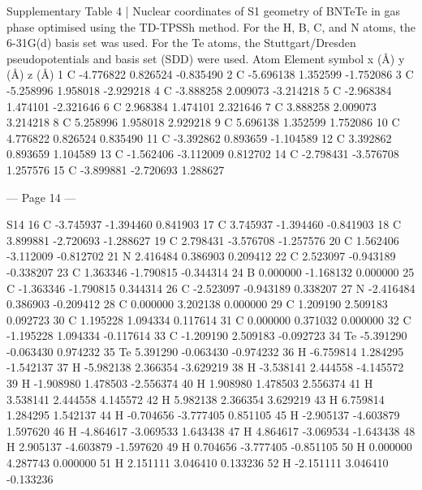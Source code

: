  
Supplementary Table 4 | Nuclear coordinates of S1 geometry of BNTeTe in gas phase 
optimised using the TD-TPSSh method. For the H, B, C, and N atoms, the 6-31G(d) basis set 
was used. For the Te atoms, the Stuttgart/Dresden pseudopotentials and basis set (SDD) were 
used. 
Atom 
Element symbol 
x (Å)        
y (Å)       
z (Å)        
1 
C 
-4.776822  
0.826524  
-0.835490  
2 
C 
-5.696138  
1.352599  
-1.752086  
3 
C 
-5.258996  
1.958018  
-2.929218  
4 
C 
-3.888258  
2.009073  
-3.214218  
5 
C 
-2.968384  
1.474101  
-2.321646  
6 
C 
2.968384  
1.474101  
2.321646  
7 
C 
3.888258  
2.009073  
3.214218  
8 
C 
5.258996  
1.958018  
2.929218  
9 
C 
5.696138  
1.352599  
1.752086  
10 
C 
4.776822  
0.826524  
0.835490  
11 
C 
-3.392862  
0.893659  
-1.104589  
12 
C 
3.392862  
0.893659  
1.104589  
13 
C 
-1.562406  
-3.112009  
0.812702  
14 
C 
-2.798431  
-3.576708  
1.257576  
15 
C 
-3.899881  
-2.720693  
1.288627  


--- Page 14 ---
 
S14 
16 
C 
-3.745937  
-1.394460  
0.841903  
17 
C 
3.745937  
-1.394460  
-0.841903  
18 
C 
3.899881  
-2.720693  
-1.288627  
19 
C 
2.798431  
-3.576708  
-1.257576  
20 
C 
1.562406  
-3.112009  
-0.812702  
21 
N 
2.416484  
0.386903  
0.209412  
22 
C 
2.523097  
-0.943189  
-0.338207  
23 
C 
1.363346  
-1.790815  
-0.344314  
24 
B 
0.000000  
-1.168132  
0.000000  
25 
C 
-1.363346  
-1.790815  
0.344314  
26 
C 
-2.523097  
-0.943189  
0.338207  
27 
N 
-2.416484  
0.386903  
-0.209412  
28 
C 
0.000000  
3.202138  
0.000000  
29 
C 
1.209190  
2.509183  
0.092723  
30 
C 
1.195228  
1.094334  
0.117614  
31 
C 
0.000000  
0.371032  
0.000000  
32 
C 
-1.195228  
1.094334  
-0.117614  
33 
C 
-1.209190  
2.509183  
-0.092723  
34 
Te 
-5.391290  
-0.063430  
0.974232  
35 
Te 
5.391290  
-0.063430  
-0.974232  
36 
H 
-6.759814  
1.284295  
-1.542137  
37 
H 
-5.982138  
2.366354  
-3.629219  
38 
H 
-3.538141  
2.444558  
-4.145572  
39 
H 
-1.908980  
1.478503  
-2.556374  
40 
H 
1.908980  
1.478503  
2.556374  
41 
H 
3.538141  
2.444558  
4.145572  
42 
H 
5.982138  
2.366354  
3.629219  
43 
H 
6.759814  
1.284295  
1.542137  
44 
H 
-0.704656  
-3.777405  
0.851105  
45 
H 
-2.905137  
-4.603879  
1.597620  
46 
H 
-4.864617  
-3.069533  
1.643438  
47 
H 
4.864617  
-3.069534  
-1.643438  
48 
H 
2.905137  
-4.603879  
-1.597620  
49 
H 
0.704656  
-3.777405  
-0.851105  
50 
H 
0.000000  
4.287743  
0.000000  
51 
H 
2.151111  
3.046410  
0.133236  
52 
H 
-2.151111  
3.046410  
-0.133236  
 
